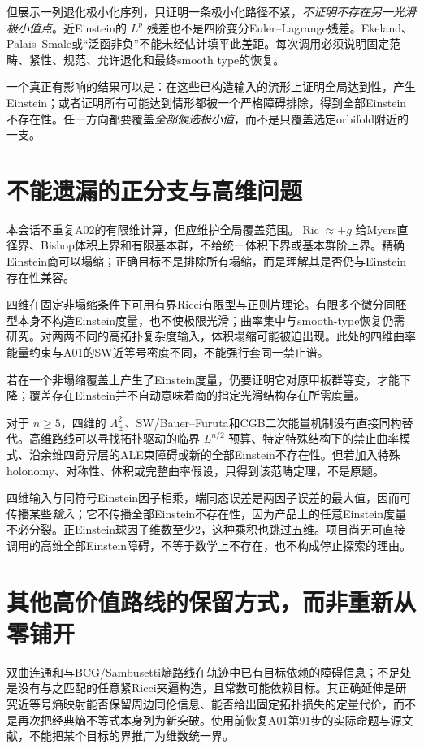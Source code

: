 \documentclass[UTF8,a4paper,11pt,fontset=fandol]{ctexart}
\numberwithin{equation}{section}
\theoremstyle{definition}
\newcommand{\Ric}{\operatorname{Ric}}
\begin{document}
但展示一列退化极小化序列，只证明一条极小化路径不紧，\emph{不证明不存在另一光滑极小值点}。近Einstein的 $L^p$ 残差也不是四阶变分Euler--Lagrange残差。Ekeland、Palais--Smale或“泛函非负”不能未经估计填平此差距。每次调用必须说明固定范畴、紧性、规范、允许退化和最终smooth type的恢复。

一个真正有影响的结果可以是：在这些已构造输入的流形上证明全局达到性，产生Einstein；或者证明所有可能达到情形都被一个严格障碍排除，得到全部Einstein不存在性。任一方向都要覆盖\emph{全部候选极小值}，而不是只覆盖选定orbifold附近的一支。

\section{不能遗漏的正分支与高维问题}
本会话不重复A02的有限维计算，但应维护全局覆盖范围。$\Ric\approx+g$ 给Myers直径界、Bishop体积上界和有限基本群，不给统一体积下界或基本群阶上界。精确Einstein商可以塌缩；正确目标不是排除所有塌缩，而是理解其是否仍与Einstein存在性兼容。

四维在固定非塌缩条件下可用有界Ricci有限型与正则片理论\cite{CN}。有限多个微分同胚型本身不构造Einstein度量，也不使极限光滑；曲率集中与smooth-type恢复仍需研究。对两两不同的高拓扑复杂度输入，体积塌缩可能被迫出现。此处的四维曲率能量约束与A01的SW近等号密度不同，不能强行套同一禁止谱。

若在一个非塌缩覆盖上产生了Einstein度量，仍要证明它对原甲板群等变，才能下降；覆盖存在Einstein并不自动意味着商的指定光滑结构存在所需度量。

对于 $n\ge5$，四维的 $\Lambda^2_\pm$、SW/Bauer--Furuta和CGB二次能量机制没有直接同构替代。高维路线可以寻找拓扑驱动的临界 $L^{n/2}$ 预算、特定特殊结构下的禁止曲率模式、沿余维四奇异层的ALE束障碍或新的全部Einstein不存在性。但若加入特殊holonomy、对称性、体积或完整曲率假设，只得到该范畴定理，不是原题。

四维输入与同符号Einstein因子相乘，端同态误差是两因子误差的最大值，因而可传播某些\emph{输入}；它不传播全部Einstein不存在性，因为产品上的任意Einstein度量不必分裂。正Einstein球因子维数至少2，这种乘积也跳过五维。项目尚无可直接调用的高维全部Einstein障碍，不等于数学上不存在，也不构成停止探索的理由。


\section{其他高价值路线的保留方式，而非重新从零铺开}
双曲连通和与BCG/Sambusetti熵路线在轨迹中已有目标依赖的障碍信息；不足处是没有与之匹配的任意紧Ricci夹逼构造，且常数可能依赖目标。其正确延伸是研究近等号熵映射能否保留周边同伦信息、能否给出固定拓扑损失的定量代价，而不是再次把经典熵不等式本身列为新突破。使用前恢复A01第91步的实际命题与源文献，不能把某个目标的界推广为维数统一界。
\end{document}
